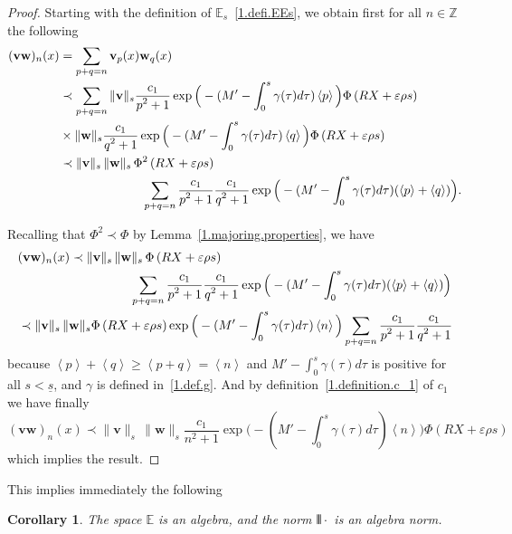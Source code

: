 \documentclass[10pt]{amsart}
\newtheorem{coro}[cdrthm]{Corollary}
\theoremstyle{definition}
\theoremstyle{plain}
\newcommand*\e{\varepsilon}
\newcommand*\Z{{\mathbb Z}}
\newcommand*\EE{{\mathbb E}}
\newcommand*\g{\gamma}
\newcommand{\vbf}{{\mathbf v}}
\newcommand*\w{{\mathbf w}}
\newcommand*\und{\underline}
\DeclarePairedDelimiter{\VERT}{|\mkern -1.6mu|\mkern -1.6mu|}{|\mkern -1.6mu|\mkern -1.6mu|}
\begin{document}
\begin{proof}
Starting with the definition of $\EE_{s}$~\eqref{1.defi.EEs}, we obtain first for all $n\in\Z$ the following
\begin{align*}
(\vbf \w)_{n}(x) &= \sum_{p+q=n} \vbf_p(x) \w_q(x) \\
 &\prec \sum_{p+q=n}
 \|\vbf\|_{s} \frac{\displaystyle c_1}{\displaystyle p^2+1}\exp\Big({}-(M' - \int_{0}^{s} \g(\tau) d\tau)\left< p \right>\Big) \Phi\left(R X+\e\rho s\right) \\
&\times \|\w\|_{s} \frac{\displaystyle c_1}{\displaystyle q^2+1}\exp\Big({}-(M' - \int_{0}^{s} \g(\tau) d\tau)\left< q \right>\Big) \Phi\left(R X+\e\rho s\right)
 \\
 &\prec \|\vbf\|_{s} \, \|\w\|_{s}\,\Phi^2\left(R X+\e\rho s\right) \\
&\mkern120 mu \sum_{p+q=n} \frac{\displaystyle c_1}{\displaystyle p^2+1}\frac{\displaystyle c_1}{\displaystyle q^2+1}\exp\Big({}-(M' - \int_{0}^{s} \g(\tau) d\tau)(\left< p \right>+\left< q \right>)\Big).
\end{align*}

Recalling that $\Phi^2 \prec \Phi$ by Lemma~\ref{1.majoring.properties}, we have
\begin{align*}
&(\vbf \w)_{n}(x) \prec \|\vbf\|_{s} \, \|\w\|_{s}\,\Phi\left(R X+\e\rho s\right)\\
&\mkern 160mu \sum_{p+q=n} \frac{\displaystyle c_1}{\displaystyle p^2+1}\frac{\displaystyle c_1}{\displaystyle q^2+1}\exp\Big({}-(M' - \int_{0}^{s} \g(\tau) d\tau)(\left< p \right>+\left< q \right>)\Big) \\
& \prec \|\vbf\|_{s} \, \|\w\|_{s} \Phi\left(R X+\e\rho s\right) \exp\Big({}-(M' - \int_{0}^{s} \g(\tau) d\tau)\left< n \right>\Big) \sum_{p+q=n} \frac{\displaystyle c_1}{\displaystyle p^2+1}\frac{\displaystyle c_1}{\displaystyle q^2+1}
\end{align*}
because $\left< p \right>+\left< q \right> \geq \left< p+q\right> = \left<n\right>$ and $ M' - \int_{0}^{s} \g(\tau) d\tau $ is positive for all $s < \und{s}$, and $\g$ is defined in~\eqref{1.def.g}. And by definition~\eqref{1.definition.c_1} of $c_1$ we have finally
\[
(\vbf \w)_{n}(x) \prec \|\vbf\|_{s} \, \|\w\|_{s}\frac{\displaystyle c_1}{\displaystyle n^2+1}\exp\Big({}-(M' - \int_{0}^{s} \g(\tau) d\tau)\left< n \right>\Big) \Phi\left(R X+\e\rho s\right)
\]
which implies the result.
\end{proof}
\goodbreak
This implies immediately the following

\begin{coro}\label{1.coro.algebra}
The space $\EE$ is an algebra, and the norm $\VERT{\cdot}$ is an algebra norm.
\end{coro}
\end{document}
